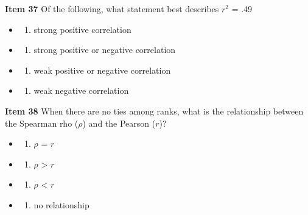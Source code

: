 \documentclass[
  english,
]{book}
\providecommand{\tightlist}{%
  \setlength{\itemsep}{0pt}\setlength{\parskip}{0pt}}
\begin{document}
\textbf{Item 37 } Of the following, what statement best describes \(r^2\) = .49

\begin{itemize}
\item
  \begin{enumerate}
  \def\labelenumi{\alph{enumi})}
  \tightlist
  \item
    strong positive correlation
  \end{enumerate}
\item
  \begin{enumerate}
  \def\labelenumi{\alph{enumi})}
  \setcounter{enumi}{1}
  \tightlist
  \item
    strong positive or negative correlation
  \end{enumerate}
\item
  \begin{enumerate}
  \def\labelenumi{\alph{enumi})}
  \setcounter{enumi}{2}
  \tightlist
  \item
    weak positive or negative correlation
  \end{enumerate}
\item
  \begin{enumerate}
  \def\labelenumi{\alph{enumi})}
  \setcounter{enumi}{3}
  \tightlist
  \item
    weak negative correlation
  \end{enumerate}
\end{itemize}

\textbf{Item 38} When there are no ties among ranks, what is the relationship between the Spearman rho (\(\rho\)) and the Pearson (\(r\))?

\begin{itemize}
\item
  \begin{enumerate}
  \def\labelenumi{\alph{enumi})}
  \tightlist
  \item
    \(\rho\) = \(r\)
  \end{enumerate}
\item
  \begin{enumerate}
  \def\labelenumi{\roman{enumi})}
  \setcounter{enumi}{1}
  \tightlist
  \item
    \(\rho\) \textgreater{} \(r\)
  \end{enumerate}
\item
  \begin{enumerate}
  \def\labelenumi{\alph{enumi})}
  \tightlist
  \item
    \(\rho\) \textless{} \(r\)
  \end{enumerate}
\item
  \begin{enumerate}
  \def\labelenumi{\alph{enumi})}
  \setcounter{enumi}{1}
  \tightlist
  \item
    no relationship
  \end{enumerate}
\end{itemize}
\end{document}
